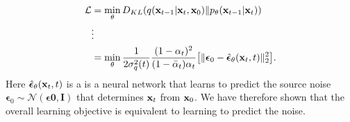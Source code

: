 \begin{align}
	\mathcal{L} &= \min_\theta D_{KL}(q({\mathbf{x}}_{t-1}|{\mathbf{x}}_t, {\mathbf{x}}_0)\|p_\theta({\mathbf{x}}_{t-1}|{\mathbf{x}}_{t}))\\
				& \vdots\\
				&= \min_\theta \frac{1}{2\sigma^2_q(t)}\frac{(1-\alpha_t)^2}{(1-\bar{\alpha}_t)\alpha_t}\big[\|\boldsymbol{\epsilon}_0- \hat{\boldsymbol{\epsilon}}_\theta({\mathbf{x}}_t,t)\|^2_2\big].
	\label{eq:diffusion_kl_mean_simple}
\end{align}
Here $\hat{\boldsymbol{\epsilon}}_\theta({\mathbf{x}}_t,t)$ is a is a neural network that learns to predict the source noise $\boldsymbol{\epsilon}_0 \sim \mathcal{N}(\boldsymbol{\epsilon} \mathbf{0}, \mathbf{I})$ that determines ${\mathbf{x}}_t$ from ${\mathbf{x}}_0$. We have therefore shown that the overall learning objective is equivalent to learning to predict the noise.


